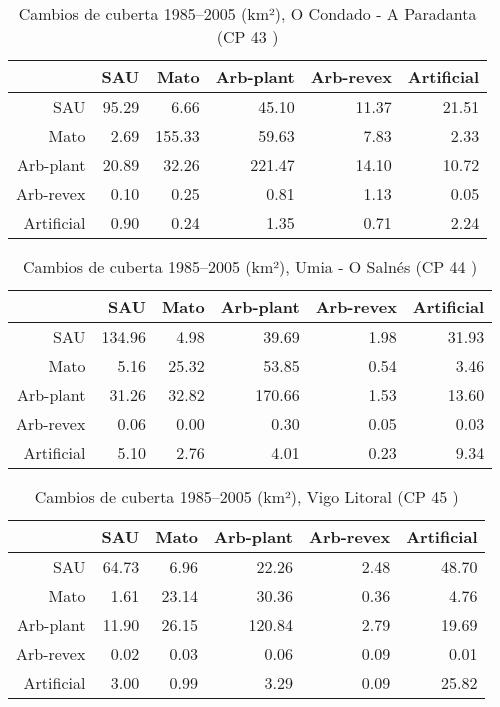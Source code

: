 \begin{table}[p]
\centering
\caption{Cambios de cuberta 1985--2005 (km²), O Condado - A Paradanta (CP 43 )} 
\label{TaboaContinxCP43}
\begin{tabular}{rrrrrr}
  \hline
 & SAU & Mato & Arb-plant & Arb-revex & Artificial \\ 
  \hline
SAU & 95.29 & 6.66 & 45.10 & 11.37 & 21.51 \\ 
  Mato & 2.69 & 155.33 & 59.63 & 7.83 & 2.33 \\ 
  Arb-plant & 20.89 & 32.26 & 221.47 & 14.10 & 10.72 \\ 
  Arb-revex & 0.10 & 0.25 & 0.81 & 1.13 & 0.05 \\ 
  Artificial & 0.90 & 0.24 & 1.35 & 0.71 & 2.24 \\ 
   \hline
\end{tabular}
\end{table}
\begin{table}[p]
\centering
\caption{Cambios de cuberta 1985--2005 (km²), Umia - O Salnés (CP 44 )} 
\label{TaboaContinxCP44}
\begin{tabular}{rrrrrr}
  \hline
 & SAU & Mato & Arb-plant & Arb-revex & Artificial \\ 
  \hline
SAU & 134.96 & 4.98 & 39.69 & 1.98 & 31.93 \\ 
  Mato & 5.16 & 25.32 & 53.85 & 0.54 & 3.46 \\ 
  Arb-plant & 31.26 & 32.82 & 170.66 & 1.53 & 13.60 \\ 
  Arb-revex & 0.06 & 0.00 & 0.30 & 0.05 & 0.03 \\ 
  Artificial & 5.10 & 2.76 & 4.01 & 0.23 & 9.34 \\ 
   \hline
\end{tabular}
\end{table}
\begin{table}[p]
\centering
\caption{Cambios de cuberta 1985--2005 (km²), Vigo Litoral (CP 45 )} 
\label{TaboaContinxCP45}
\begin{tabular}{rrrrrr}
  \hline
 & SAU & Mato & Arb-plant & Arb-revex & Artificial \\ 
  \hline
SAU & 64.73 & 6.96 & 22.26 & 2.48 & 48.70 \\ 
  Mato & 1.61 & 23.14 & 30.36 & 0.36 & 4.76 \\ 
  Arb-plant & 11.90 & 26.15 & 120.84 & 2.79 & 19.69 \\ 
  Arb-revex & 0.02 & 0.03 & 0.06 & 0.09 & 0.01 \\ 
  Artificial & 3.00 & 0.99 & 3.29 & 0.09 & 25.82 \\ 
   \hline
\end{tabular}
\end{table}
